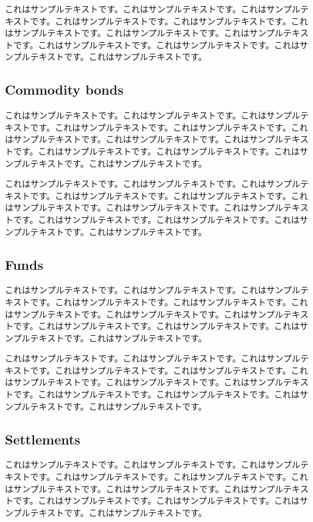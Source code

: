 \documentclass[a4paper, dvipdfmx]{jsarticle}
\begin{document}
これはサンプルテキストです。これはサンプルテキストです。これはサンプルテキストです。これはサンプルテキストです。これはサンプルテキストです。これはサンプルテキストです。これはサンプルテキストです。これはサンプルテキストです。これはサンプルテキストです。これはサンプルテキストです。これはサンプルテキストです。これはサンプルテキストです。

\subsection{Commodity bonds}
これはサンプルテキストです。これはサンプルテキストです。これはサンプルテキストです。これはサンプルテキストです。これはサンプルテキストです。これはサンプルテキストです。これはサンプルテキストです。これはサンプルテキストです。これはサンプルテキストです。これはサンプルテキストです。これはサンプルテキストです。これはサンプルテキストです。

これはサンプルテキストです。これはサンプルテキストです。これはサンプルテキストです。これはサンプルテキストです。これはサンプルテキストです。これはサンプルテキストです。これはサンプルテキストです。これはサンプルテキストです。これはサンプルテキストです。これはサンプルテキストです。これはサンプルテキストです。これはサンプルテキストです。

\subsection{Funds}
これはサンプルテキストです。これはサンプルテキストです。これはサンプルテキストです。これはサンプルテキストです。これはサンプルテキストです。これはサンプルテキストです。これはサンプルテキストです。これはサンプルテキストです。これはサンプルテキストです。これはサンプルテキストです。これはサンプルテキストです。これはサンプルテキストです。

これはサンプルテキストです。これはサンプルテキストです。これはサンプルテキストです。これはサンプルテキストです。これはサンプルテキストです。これはサンプルテキストです。これはサンプルテキストです。これはサンプルテキストです。これはサンプルテキストです。これはサンプルテキストです。これはサンプルテキストです。これはサンプルテキストです。

\subsection{Settlements}
これはサンプルテキストです。これはサンプルテキストです。これはサンプルテキストです。これはサンプルテキストです。これはサンプルテキストです。これはサンプルテキストです。これはサンプルテキストです。これはサンプルテキストです。これはサンプルテキストです。これはサンプルテキストです。これはサンプルテキストです。これはサンプルテキストです。
\end{document}
